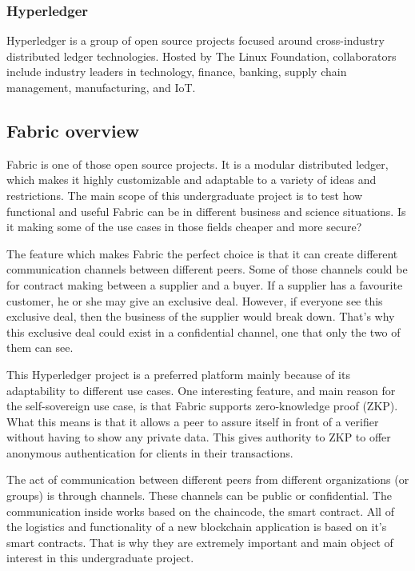 \documentclass[a4paper,11pt]{report}
\begin{document}
\subsubsection{Hyperledger}
Hyperledger is a group of open source projects focused around cross-industry distributed ledger technologies. Hosted by The Linux Foundation, collaborators include industry leaders in technology, finance, banking, supply chain management, manufacturing, and IoT.

\subsection{Fabric overview}
	Fabric is one of those open source projects. It is a modular distributed ledger, which makes it highly customizable and adaptable to a variety of ideas and restrictions. The main scope of this undergraduate project is to test how functional and useful Fabric can be in different business and science situations. Is it making some of the use cases in those fields cheaper and more secure?
	
The feature which makes Fabric the perfect choice is that it can create different communication channels between different peers. Some of those channels could be for contract making between a supplier and a buyer. If a supplier has a favourite customer, he or she may give an exclusive deal. However, if everyone see this exclusive deal, then the business of the supplier would break down. That’s why this exclusive deal could exist in a confidential channel, one that only the two of them can see. 

	This Hyperledger project is a preferred platform mainly because of its adaptability to different use cases. One interesting feature, and main reason for the self-sovereign use case, is that Fabric supports zero-knowledge proof (ZKP). What this means is that it allows a peer to assure itself in front of a verifier without having to show any private data. This gives authority to ZKP to offer anonymous authentication for clients in their transactions. \cite{li2018fppb}
	
	The act of communication between different peers from different organizations (or groups) is through channels. These channels can be public or confidential. The communication inside works based on the chaincode, the smart contract. All of the logistics and functionality of a new blockchain application is based on it’s smart contracts. That is why they are extremely important and main object of interest in this undergraduate project.
\end{document}
